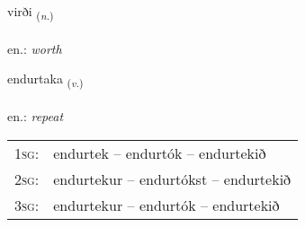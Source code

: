 \documentclass[frontgrid, backgrid]{flacards}\usepackage[]{graphicx}\usepackage[]{xcolor}
\begin{document}
\renewcommand{\flhead}{\vskip5pt \fboxsep=0pt {\small\bfseries\footnotesize Nafnorð | Noun}}
\renewcommand{\fcfoot}{\vskip5pt \fboxsep=0pt \hspace{2pt}{\small\bfseries\footnotesize 2K}}

\renewcommand{\blhead}{\vskip5pt {\small\bfseries\footnotesize Nafnorð | Noun }}
\renewcommand{\bcfoot}{\vskip5pt \hspace{2pt}{\small\bfseries\footnotesize 2K}}


{virði \small{\textsubscript{(\textit{n.})}} \\[1ex] %
\textphonetic{[vɪrðɪ]} \\
en.: \emph{worth} \\  [2ex]
\renewcommand*{\arraystretch}{0.8}
}

\renewcommand{\flhead}{\vskip5pt \fboxsep=0pt {\small\bfseries\footnotesize Sagnorð | Verb}}
\renewcommand{\fcfoot}{\vskip5pt \fboxsep=0pt \hspace{2pt}{\small\bfseries\footnotesize 2K}}

\renewcommand{\blhead}{\vskip5pt {\small\bfseries\footnotesize Sagnorð | Verb }}
\renewcommand{\bcfoot}{\vskip5pt \hspace{2pt}{\small\bfseries\footnotesize 2K}}


{endurtaka \small{\textsubscript{(\textit{v.})}} \\[1ex] %
 \\
en.: \emph{repeat} \\  [2ex]
\renewcommand*{\arraystretch}{0.8}
\begin{tabular}{p{1cm}l}
\textsc{1sg}: & endurtek -- endurtók -- endurtekið \\ 
\textsc{2sg}: & endurtekur -- endurtókst -- endurtekið \\ 
\textsc{3sg}: & endurtekur -- endurtók -- endurtekið \\ 
\end{tabular}
}
\end{document}
